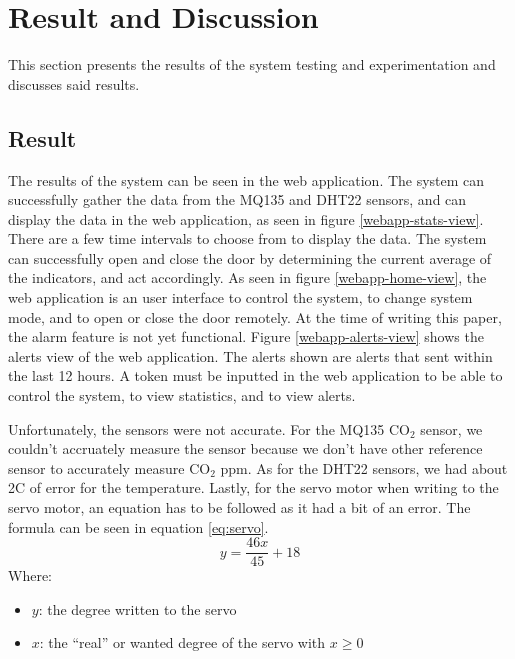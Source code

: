 \section{Result and Discussion}
This section presents the results of the system testing and experimentation and
discusses said results.

\subsection{Result}
The results of the system can be seen in the web
application. The system can successfully gather the data from the
MQ135 and DHT22 sensors, and can display the data in
the web application, as seen in figure \ref{webapp-stats-view}.
There are a few time intervals to choose from to display the data.
The system can successfully open and close the door by
determining the current average of the indicators,
and act accordingly. As seen in figure \ref{webapp-home-view},
the web application is an user interface to control the system,
to change system mode, and to open or close the door remotely.
At the time of writing this paper, the alarm feature is not yet functional.
Figure \ref{webapp-alerts-view} shows the alerts view of the web application.
The alerts shown are alerts that sent within the last 12 hours.
A token must be inputted in the web application to be able to control the system,
to view statistics, and to view alerts.

Unfortunately, the sensors were not accurate. For the MQ135 CO$_2$ sensor, we
couldn't accruately measure the sensor because we don't have other reference
sensor to accurately measure CO$_2$ ppm. As for the DHT22 sensors, we had about
2\textdegree C of error for the temperature. Lastly, for the servo motor when
writing to the servo motor, an equation has to be followed as it had a bit of an
error. The formula can be seen in equation \ref{eq:servo}.
\begin{equation}\label{eq:servo}
  y = \frac{46x}{45} + 18
\end{equation}
Where:
\begin{itemize}[label=]
  \item $y$: the degree written to the servo
  \item $x$: the ``real'' or wanted degree of the servo with $x \geq 0$
\end{itemize}

